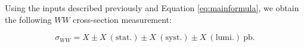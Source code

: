 Using the inputs described previously and Equation \ref{eq:mainformula},
we obtain the following $WW$ cross-section measurement:

\begin{equation*}
\sigma_{WW}  = X \pm X ~\mathrm{(stat.)} \pm X ~\mathrm{(syst.)} \pm X ~\mathrm{(lumi.)~pb}.
\end{equation*}


